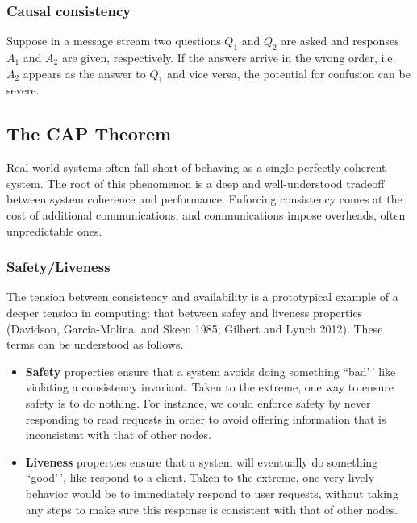 \documentclass[]             %
{NASA}                       %
\theoremstyle{definition}
\begin{document}
\hypertarget{causal-consistency}{%
\subsubsection{Causal consistency}\label{causal-consistency}}

Suppose in a message stream two questions \(Q_1\) and \(Q_2\) are asked
and responses \(A_1\) and \(A_2\) are given, respectively. If the
answers arrive in the wrong order, i.e.~\(A_2\) appears as the answer to
\(Q_1\) and vice versa, the potential for confusion can be severe.

\hypertarget{the-cap-theorem}{%
\subsection{The CAP Theorem}\label{the-cap-theorem}}

Real-world systems often fall short of behaving as a single perfectly
coherent system. The root of this phenomenon is a deep and
well-understood tradeoff between system coherence and performance.
Enforcing consistency comes at the cost of additional communications,
and communications impose overheads, often unpredictable ones.

\hypertarget{safetyliveness}{%
\subsubsection{Safety/Liveness}\label{safetyliveness}}

The tension between consistency and availability is a prototypical
example of a deeper tension in computing: that between safey and
liveness properties (Davidson, Garcia-Molina, and Skeen 1985; Gilbert
and Lynch 2012). These terms can be understood as follows.

\begin{itemize}
\item
  \textbf{Safety} properties ensure that a system avoids doing something
  ``bad'\,' like violating a consistency invariant. Taken to the
  extreme, one way to ensure safety is to do nothing. For instance, we
  could enforce safety by never responding to read requests in order to
  avoid offering information that is inconsistent with that of other
  nodes.
\item
  \textbf{Liveness} properties ensure that a system will eventually do
  something ``good'\,', like respond to a client. Taken to the extreme,
  one very lively behavior would be to immediately respond to user
  requests, without taking any steps to make sure this response is
  consistent with that of other nodes.
\end{itemize}
\end{document}
